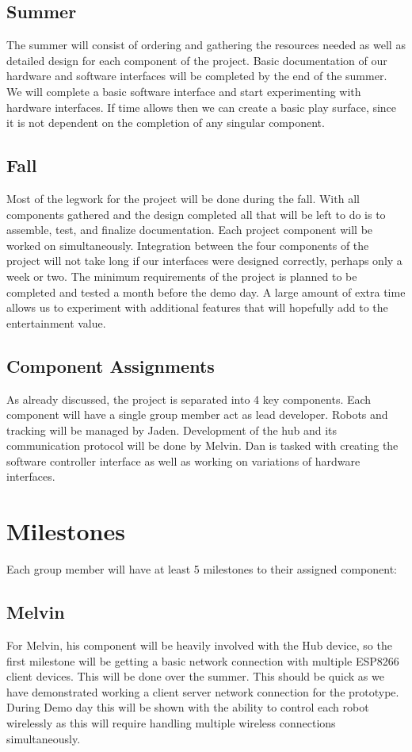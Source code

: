 \documentclass[11pt]{ieeeconf}
\begin{document}
\subsection{Summer}
The summer will consist of ordering and gathering the resources needed as well as detailed design for each component of the project. Basic documentation of our hardware and software interfaces will be completed by the end of the summer. We will complete a basic software interface and start experimenting with hardware interfaces. If time allows then we can create a basic play surface, since it is not dependent on the completion of any singular component.

\subsection{Fall}
Most of the legwork for the project will be done during the fall. With all components gathered and the design completed all that will be left to do is to assemble, test, and finalize documentation. Each project component will be worked on simultaneously. Integration between the four components of the project will not take long if our interfaces were designed correctly, perhaps only a week or two. The minimum requirements of the project is planned to be completed and tested a month before the demo day. A large amount of extra time allows us to experiment with additional features that will hopefully add to the entertainment value.

\subsection{Component Assignments}
As already discussed, the project is separated into 4 key components. Each component will have a single group member act as lead developer. Robots and tracking will be managed by Jaden. Development of the hub and its communication protocol will be done by Melvin. Dan is tasked with creating the software controller interface as well as working on variations of hardware interfaces. 


\section{Milestones}
Each group member will have at least 5 milestones to their assigned component: 

\subsection{Melvin}
For Melvin, his component will be heavily involved with the Hub device, so the first milestone will be getting a basic network connection with multiple ESP8266 client devices. This will be done over the summer. This should be quick as we have demonstrated working a client server network connection for the prototype. During Demo day this will be shown with the ability to control each robot wirelessly as this will require handling multiple wireless connections simultaneously.
\end{document}
